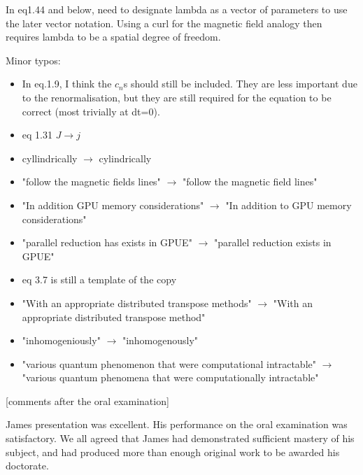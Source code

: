 \documentclass[11pt]{article}
\begin{document}

In eq1.44 and below, need to designate lambda as a vector of parameters to use the later vector notation. Using a curl for the magnetic field analogy then requires lambda to be a spatial degree of freedom.



Minor typos:

\begin{itemize}
\item In eq.1.9, I think the $c_{n}$s should still be included. They are less important due to the renormalisation, but they are still required for the equation to be correct (most trivially at dt=0).

\item eq 1.31 $J \rightarrow j$
\item cyllindrically $\rightarrow$ cylindrically
\item "follow the magnetic fields lines" $\rightarrow$ "follow the magnetic field lines"
\item "In addition GPU memory considerations" $\rightarrow$ "In addition to GPU memory considerations"
\item "parallel reduction has exists in GPUE" $\rightarrow$ "parallel reduction exists in GPUE"
\item eq 3.7 is still a template of the copy
\item "With an appropriate distributed transpose methods" $\rightarrow$ "With an appropriate distributed transpose method"
\item "inhomogeniously" $\rightarrow$ "inhomogenously"
\item "various quantum phenomenon that were computational intractable" $\rightarrow$ "various quantum phenomena that were computationally intractable"

\end{itemize}


[comments after the oral examination]

James presentation was excellent. His performance on the oral examination was satisfactory. We all agreed that James had demonstrated sufficient mastery of his subject, and had produced more than enough original work to be awarded his doctorate.
\end{document}
